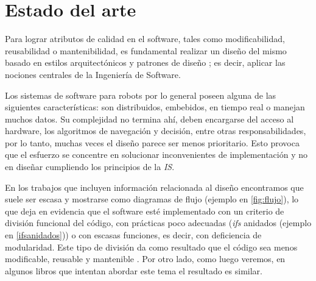 \chapter{Estado del arte}


Para lograr atributos de calidad en el software, tales como modificabilidad, reusabilidad o mantenibilidad, es fundamental realizar un diseño del mismo basado en estilos arquitectónicos y patrones de diseño \cite{Gamma:1995:DPE:186897,shawgarlan,buschmann}; es decir, aplicar las nociones centrales de la Ingeniería de Software.

Los sistemas de software para robots por lo general poseen alguna de las siguientes características: son distribuidos, embebidos, en tiempo real o manejan muchos datos. Su complejidad no termina ahí, deben encargarse del acceso al hardware, los algoritmos de navegación y decisión, entre otras responsabilidades, por lo tanto, muchas veces el diseño parece ser menos prioritario. Esto provoca que el esfuerzo se concentre en solucionar inconvenientes de implementación y no en diseñar cumpliendo los principios de la \textit{IS}.

En los trabajos que incluyen información relacionada al diseño \cite{bad-desing-auto,bad-desing-implantable,code-1,code-2,Zhang2009,bad-design-uml,bad-design-robot} encontramos que suele ser escasa y mostrarse como diagramas de flujo (ejemplo en \ref{fig:flujo}), lo que deja en evidencia que el software esté implementado con un criterio de división funcional del código, con prácticas poco adecuadas (\textit{ifs} anidados (ejemplo en \ref{ifsanidados})) o con escasas funciones, es decir, con deficiencia de modularidad. Este tipo de división da como resultado que el código sea menos modificable, reusable y mantenible \cite{parnas72}. Por otro lado, como luego veremos, en algunos libros que intentan abordar este tema \cite{douglass} el resultado es similar.

